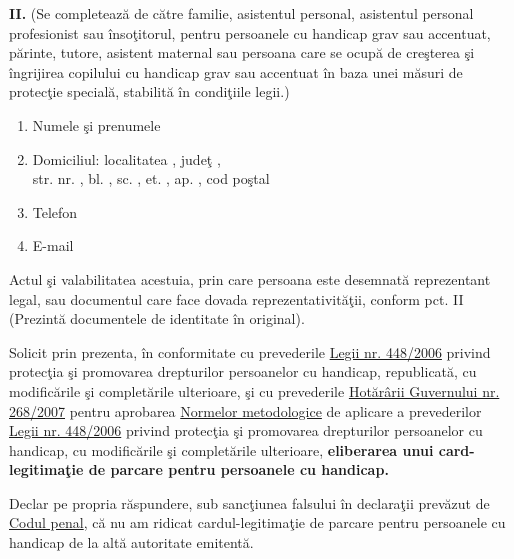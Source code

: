 \documentclass[11pt,a4paper]{article}
\newcommand{\fillline}[1][6cm]{\underline{\hspace{#1}}}
\begin{document}
\textbf{II.} (Se completează de către familie, asistentul personal, asistentul personal profesionist sau însoţitorul, pentru persoanele cu handicap grav sau accentuat, părinte, tutore, asistent maternal sau persoana care se ocupă de creşterea şi îngrijirea copilului cu handicap grav sau accentuat în baza unei măsuri de protecţie specială, stabilită în condiţiile legii.)

\begin{enumerate}[leftmargin=1cm]
\item Numele şi prenumele \fillline[10cm]
\item Domiciliul: localitatea \fillline[5cm], judeţ \fillline[4cm],\\
str. \fillline[6cm] nr. \fillline[1cm], bl. \fillline[1cm], sc. \fillline[1cm], et. \fillline[1cm], ap. \fillline[1cm], cod poştal \fillline[2cm]
\item Telefon \fillline[6cm]
\item E-mail \fillline[6cm]
\end{enumerate}

\vspace{0.2cm}

\hspace{0.5cm}Actul şi valabilitatea acestuia, prin care persoana este desemnată reprezentant legal, sau documentul care face dovada reprezentativităţii, conform pct. II \fillline[6cm] (Prezintă documentele de identitate în original).

\vspace{0.3cm}

\hspace{0.5cm}Solicit prin prezenta, în conformitate cu prevederile \underline{Legii nr. 448/2006} privind protecţia şi promovarea drepturilor persoanelor cu handicap, republicată, cu modificările şi completările ulterioare, şi cu prevederile \underline{Hotărârii Guvernului nr. 268/2007} pentru aprobarea \underline{Normelor metodologice} de aplicare a prevederilor \underline{Legii nr. 448/2006} privind protecţia şi promovarea drepturilor persoanelor cu handicap, cu modificările şi completările ulterioare, \textbf{eliberarea unui card-legitimaţie de parcare pentru persoanele cu handicap.}

\vspace{0.3cm}

\hspace{0.5cm}Declar pe propria răspundere, sub sancţiunea falsului în declaraţii prevăzut de \underline{Codul penal}, că nu am ridicat cardul-legitimaţie de parcare pentru persoanele cu handicap de la altă autoritate emitentă.
\end{document}
